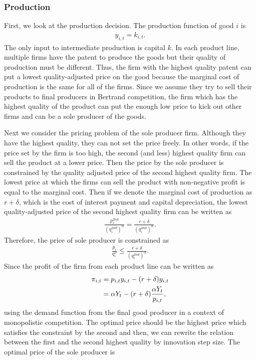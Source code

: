 \documentclass[a4paper,12pt]{article}
\begin{document}
\subsubsection{Production}
First, we look at the production decision. The production function of good $i$ is 
\begin{align}
    y_{i,t} = k_{i,t}.
\end{align}
The only input to intermediate production is capital $k$. In each product line, multiple firms have the patent to produce the goods but their quality of production must be different. Thus, the firm with the highest quality patent can put a lowest quality-adjusted price on the good because the marginal cost of production is the same for all of the firms. Since we assume they try to sell their products to final producers in Bertrand competition, the firm which has the highest quality of the product can put the enough low price to kick out other firms and can be a sole producer of the goods.\par
Next we consider the pricing problem of the sole producer firm. Although they have the highest quality, they can not set the price freely. In other words, if the price set by the firm is too high, the second (and less) highest quality firm can sell the product at a lower price. Then the price by the sole producer is constrained by the quality adjusted price of the second highest quality firm. The lowest price at which the firms can sell the product with non-negative profit is equal to the marginal cost. Then if we denote the marginal cost of production as $r+\delta$, which is the cost of interest payment and capital depreciation, the lowest quality-adjusted price of the second highest quality firm can be written as 
\begin{align}
    \frac{p_i^{2nd}}{(q_i^{2nd})^\alpha} = \frac{r+\delta}{(q_i^{2nd})^\alpha}.
\end{align}
 Therefore, the price of sole producer is constrained as
 \begin{align}
    \frac{p_i}{q_i^\alpha} \leq \frac{r+\delta}{(q_i^{2nd})^\alpha}.
 \end{align}
Since the profit of the firm from each product line can be written as
\begin{align}
   \notag \pi_{i,t} &= p_{i,t} y_{i,t} - (r+\delta) y_{i,t}\\
   &= \alpha Y_t - (r+\delta)  \frac{\alpha Y_t}{p_{i,t}},
\end{align}
using the demand function from the final good producer in a context of monopolistic competition. The optimal price should be the highest price which satisfies the constraint by the second and then, we can rewrite the relation between the first and the second highest quality by innovation step size. The optimal price of the sole producer is 
\end{document}
